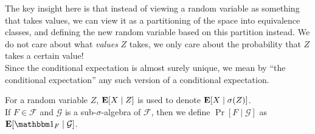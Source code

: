 		The key insight here is that instead of viewing a random variable as something that takes values, we can view it as a partitioning of the space into equivalence classes, and defining the new random variable based on this partition instead. We do not care about what \emph{values} $Z$ takes, we only care about the probability that $Z$ takes a certain value!\\
		Since the conditional expectation is almost surely unique, we mean by ``the conditional expectation'' any such version of a conditional expectation. 

		For a random variable $Z$, $\textbf{E}[X\mid Z]$ is used to denote $\textbf{E}[X\mid\sigma(Z)]$.\\

		If $F\in\mathcal{F}$ and $\mathcal{G}$ is a sub-$\sigma$-algebra of $\mathcal{F}$, then we define $\Pr[F\mid\mathcal{G}]$ as $\expec[\indic_F\mid\mathcal{G}]$.


